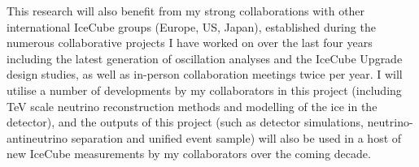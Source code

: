 \documentclass[a4paper,11pt]{article}
\begin{document}
This research will also benefit from my strong collaborations with other international IceCube groups (Europe, US, Japan), established during the numerous collaborative projects I have worked on over the last four years including the latest generation of oscillation analyses and the IceCube Upgrade design studies, as well as in-person collaboration meetings twice per year. I will utilise a number of developments by my collaborators in this project (including TeV scale neutrino reconstruction methods and modelling of the ice in the detector), and the outputs of this project (such as detector simulations, neutrino-antineutrino separation and unified event sample) will also be used in a host of new IceCube measurements by my collaborators over the coming decade. \\





\vspace{0.3cm}


\end{document}
